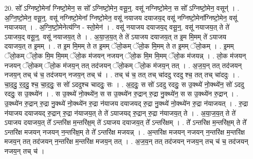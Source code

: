 \documentclass[17pt]{extarticle}
\begin{document}
20. सो᳚ ऽग्निष्टो॒मेना᳚ ग्निष्टो॒मेन॒ स सो᳚ ऽग्निष्टो॒मेन॒ वसू॒न्॒. वसू॑ नग्निष्टो॒मेन॒ स सो᳚ ऽग्निष्टो॒मेन॒ वसून्॑ । . अ॒ग्नि॒ष्टो॒मेन॒ वसू॒न्॒. वसू॑ नग्निष्टो॒मेना᳚ ग्निष्टो॒मेन॒ वसू॑ नयाजय दयाजय॒द् वसू॑ नग्निष्टो॒मेना᳚ग्निष्टो॒मेन॒ वसू॑ नयाजयत् । . अ॒ग्नि॒ष्टो॒मेनेत्य॑ग्नि - स्तो॒मेन॑ । . वसू॑ नयाजय दयाजय॒द् वसू॒न्॒. वसू॑ नयाजय॒त् ते ते॑ ऽयाजय॒द् वसू॒न्॒. वसू॑ नयाजय॒त् ते । . अ॒या॒ज॒य॒त् ते ते॑ ऽयाजय दयाजय॒त् त इ॒म मि॒मम् ते॑ ऽयाजय दयाजय॒त् त इ॒मम् । . त इ॒म मि॒मम् ते त इ॒मम् ॅलो॒कम् ॅलो॒क मि॒मम् ते त इ॒मम् ॅलो॒कम् । . इ॒मम् ॅलो॒कम् ॅलो॒क मि॒म मि॒मम् ॅलो॒क म॑जयन् नजयन् ॅलो॒क मि॒म मि॒मम् ॅलो॒क म॑जयन्न् । . लो॒क म॑जयन् नजयन् ॅलो॒कम् ॅलो॒क म॑जय॒न् तत् तद॑जयन् ॅलो॒कम् ॅलो॒क म॑जय॒न् तत् । . अ॒ज॒य॒न् तत् तद॑जयन् नजय॒न् तच् च॑ च॒ तद॑जयन् नजय॒न् तच् च॑ । . तच् च॑ च॒ तत् तच् चा॑ददु रददु श्च॒ तत् तच् चा॑ददुः । . चा॒द॒दु॒ र॒द॒दु॒ श्च॒ चा॒द॒दुः॒ स सो॑ ऽददुश्च चाददुः॒ सः । . अ॒द॒दुः॒ स सो॑ ऽददु रददुः॒ स उ॒क्थ्ये॑ नो॒क्थ्ये॑न॒ सो॑ ऽददु रददुः॒ स उ॒क्थ्ये॑न । . स उ॒क्थ्ये॑ नो॒क्थ्ये॑न॒ स स उ॒क्थ्ये॑न रु॒द्रान् रु॒द्रा नु॒क्थ्ये॑न॒ स स उ॒क्थ्ये॑न रु॒द्रान् । . उ॒क्थ्ये॑न रु॒द्रान् रु॒द्रा नु॒क्थ्ये॑ नो॒क्थ्ये॑न रु॒द्रा न॑याजय दयाजयद् रु॒द्रा नु॒क्थ्ये॑ नो॒क्थ्ये॑न रु॒द्रा न॑याजयत् । . रु॒द्रा न॑याजय दयाजयद् रु॒द्रान् रु॒द्रा न॑याजय॒त् ते ते॑ ऽयाजयद् रु॒द्रान् रु॒द्रा न॑याजय॒त् ते । . अ॒या॒ज॒य॒त् ते ते॑ ऽयाजय दयाजय॒त् ते᳚ ऽन्तरि॑क्ष म॒न्तरि॑क्ष॒म् ते॑ ऽयाजय दयाजय॒त् ते᳚ ऽन्तरि॑क्षम् । . ते᳚ ऽन्तरि॑क्ष म॒न्तरि॑क्ष॒म् ते ते᳚ ऽन्तरि॑क्ष मजयन् नजयन् न॒न्तरि॑क्ष॒म् ते ते᳚ ऽन्तरि॑क्ष मजयन्न् । . अ॒न्तरि॑क्ष मजयन् नजयन् न॒न्तरि॑क्ष म॒न्तरि॑क्ष मजय॒न् तत् तद॑जयन् न॒न्तरि॑क्ष म॒न्तरि॑क्ष मजय॒न् तत् । . अ॒ज॒य॒न् तत् तद॑जयन् नजय॒न् तच् च॑ च॒ तद॑जयन् नजय॒न् तच् च॑ । \newline
\end{document}
